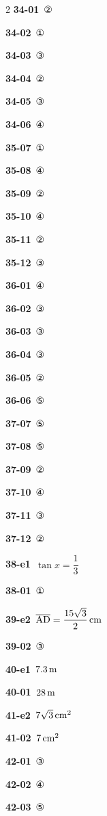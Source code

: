 \documentclass[10pt,a4paper]{article}
\newcommand{\seg}[1]{\overline{\mathrm{#1}}}
\begin{document}
\begin{multicols}{2}
\noindent\textbf{34-01}\ ②\par
\noindent\textbf{34-02}\ ①\par
\noindent\textbf{34-03}\ ③\par
\noindent\textbf{34-04}\ ②\par
\noindent\textbf{34-05}\ ③\par
\noindent\textbf{34-06}\ ④\par
\noindent\textbf{35-07}\ ①\par
\noindent\textbf{35-08}\ ④\par
\noindent\textbf{35-09}\ ②\par
\noindent\textbf{35-10}\ ④\par
\noindent\textbf{35-11}\ ②\par
\noindent\textbf{35-12}\ ③\par
\noindent\textbf{36-01}\ ④\par
\noindent\textbf{36-02}\ ③\par
\noindent\textbf{36-03}\ ③\par
\noindent\textbf{36-04}\ ③\par
\noindent\textbf{36-05}\ ②\par
\noindent\textbf{36-06}\ ⑤\par
\noindent\textbf{37-07}\ ⑤\par
\noindent\textbf{37-08}\ ⑤\par
\noindent\textbf{37-09}\ ②\par
\noindent\textbf{37-10}\ ④\par
\noindent\textbf{37-11}\ ③\par
\noindent\textbf{37-12}\ ②\par
\noindent\textbf{38-e1}\ $\tan x=\dfrac{1}{3}$\par
\noindent\textbf{38-01}\ ①\par
\noindent\textbf{39-e2}\ $\seg{AD}=\dfrac{15\sqrt{3}}{2}\mkern3mu \mathrm{cm}$\par
\noindent\textbf{39-02}\ ③\par
\noindent\textbf{40-e1}\ $7.3\mkern3mu \mathrm{m}$\par
\noindent\textbf{40-01}\ $28\mkern3mu \mathrm{m}$\par
\noindent\textbf{41-e2}\ $7\sqrt{3}\mkern3mu \mathrm{cm}^2$\par
\noindent\textbf{41-02}\ $7\mkern3mu \mathrm{cm}^2$\par
\noindent\textbf{42-01}\ ③\par
\noindent\textbf{42-02}\ ④\par
\noindent\textbf{42-03}\ ⑤\par

\end{multicols}
\end{document}
